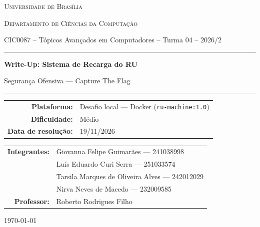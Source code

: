 \documentclass[12pt,a4paper]{article}
\newcommand{\desafioNome}{Sistema de Recarga do RU}
\newcommand{\plataforma}{Desafio local --- Docker (\texttt{ru-machine:1.0})}
\newcommand{\dificuldade}{Médio}
\newcommand{\dataResolucao}{19/11/2026}
\newcommand{\materia}{CIC0087 -- Tópicos Avançados em Computadores -- Turma 04 -- 2026/2}
\newcommand{\departamento}{Departamento de Ciências da Computação}
\newcommand{\professor}{Roberto Rodrigues Filho}
\newcommand{\universidade}{Universidade de Brasília}
\begin{document}
\begin{titlepage}
  \thispagestyle{empty}
  \centering
  {\scshape \universidade \par}
  {\scshape \departamento \par}
  \vspace{0.4cm}
  {\small \materia \par}
  \vspace{2.5cm}

  \rule{\linewidth}{0.4pt}\par
  \vspace{0.6cm}
  {\huge \bfseries Write-Up: \desafioNome \par}
  \vspace{0.4cm}
  {\large Segurança Ofensiva --- Capture The Flag \par}
  \vspace{0.6cm}
  \rule{\linewidth}{0.4pt}\par

  \vspace{2.0cm}
  \begin{tabular}{rl}
    \textbf{Plataforma:}       & \plataforma       \\[4pt]
    \textbf{Dificuldade:}      & \dificuldade      \\[4pt]
    \textbf{Data de resolução:}& \dataResolucao    \\
  \end{tabular}

  \vfill

  \begin{tabular}{rl}
    \textbf{Integrantes:} & Giovanna Felipe Guimarães --- 241038998 \\[4pt]
                          & Luís Eduardo Curi Serra --- 251033574 \\[4pt]
                          & Tarsila Marques de Oliveira Alves --- 242012029 \\[4pt]
                          & Nirva Neves de Macedo --- 232009585 \\[8pt]
    \textbf{Professor:}   & \professor \\
  \end{tabular}

  \vspace{1.2cm}
  {\small \today \par}
\end{titlepage}

\newpage
\tableofcontents
\thispagestyle{fancy}
\newpage
\end{document}
